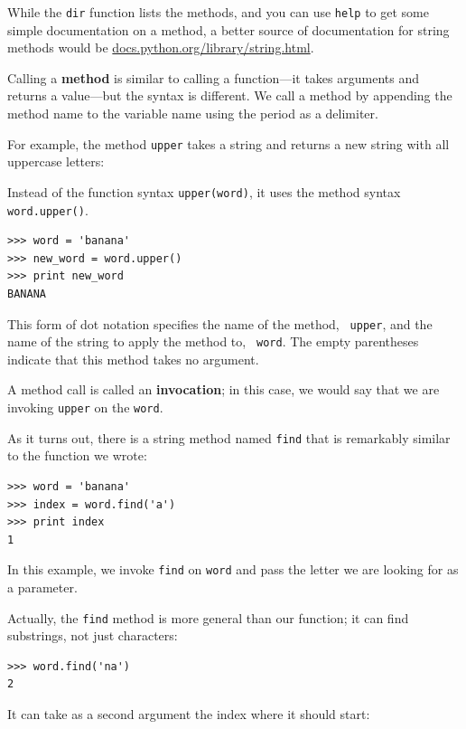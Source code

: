 \documentclass[10pt]{book}
\begin{document}
While the {\tt dir} function lists the methods, and you 
can use {\tt help} to get some simple documentation on a method, 
a better source of documentation for string methods would be
\url{docs.python.org/library/string.html}.

Calling a {\bf method} is similar to calling a function---it 
takes arguments and
returns a value---but the syntax is different.  We call a method
by appending the method name to the variable name using the period 
as a delimiter.

For example, the
method {\tt upper} takes a string and returns a new string with
all uppercase letters:


Instead of the function syntax {\tt upper(word)}, it uses
the method syntax {\tt word.upper()}.


\beforeverb
\begin{verbatim}
>>> word = 'banana'
>>> new_word = word.upper()
>>> print new_word
BANANA
\end{verbatim}
\afterverb
%
This form of dot notation specifies the name of the method, {\tt
upper}, and the name of the string to apply the method to, {\tt
word}.  The empty parentheses indicate that this method takes no
argument.


A method call is called an {\bf invocation}; in this case, we would
say that we are invoking {\tt upper} on the {\tt word}.


As it turns out, there is a string method named {\tt find} that
is remarkably similar to the function we wrote:

\beforeverb
\begin{verbatim}
>>> word = 'banana'
>>> index = word.find('a')
>>> print index
1
\end{verbatim}
\afterverb
%
In this example, we invoke {\tt find} on {\tt word} and pass
the letter we are looking for as a parameter.

Actually, the {\tt find} method is more general than our function;
it can find substrings, not just characters:

\beforeverb
\begin{verbatim}
>>> word.find('na')
2
\end{verbatim}
\afterverb
%
It can take as a second argument the index where it should start:
\end{document}
